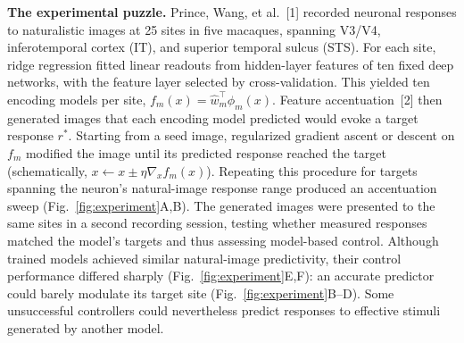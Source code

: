\documentclass[12pt,a4paper]{article}
\newcommand{\head}[1]{\par\noindent\textbf{#1}\enspace\ignorespaces}
\begin{document}
\head{The experimental puzzle.}
Prince, Wang, et al.~[1] recorded neuronal responses to naturalistic images at 25 sites in five macaques, spanning V3/V4, inferotemporal cortex (IT), and superior temporal sulcus (STS). For each site, ridge regression fitted linear readouts from hidden-layer features of ten fixed deep networks, with the feature layer selected by cross-validation. This yielded ten encoding models per site, $f_m(x)=\hat w_m^\top\phi_m(x)$.
Feature accentuation~[2] then generated images that each encoding model predicted would evoke a target response $r^*$. Starting from a seed image, regularized gradient ascent or descent on $f_m$ modified the image until its predicted response reached the target (schematically, $x\leftarrow x\pm\eta\nabla_x f_m(x)$). Repeating this procedure for targets spanning the neuron's natural-image response range produced an accentuation sweep (Fig.~\ref{fig:experiment}A,B).
The generated images were presented to the same sites in a second recording session, testing whether measured responses matched the model's targets and thus assessing model-based control. Although trained models achieved similar natural-image predictivity, their control performance differed sharply (Fig.~\ref{fig:experiment}E,F): an accurate predictor could barely modulate its target site (Fig.~\ref{fig:experiment}B--D). Some unsuccessful controllers could nevertheless predict responses to effective stimuli generated by another model.
\end{document}
